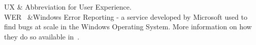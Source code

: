 \begin{longtabu}
UX & Abbreviation for User Experience. \\

WER~\label{glossary-wer} &Windows Error Reporting - a service developed by Microsoft used to find bugs at scale in the Windows Operating System. More information on how they do so available in~\citep{kinshuman2009_debugging_in_the_very_large, kinshuman2011_debugging_in_the_very_large}. \\

\caption{Glossary with Abbreviations} \\
\end{longtabu}







\clearpage